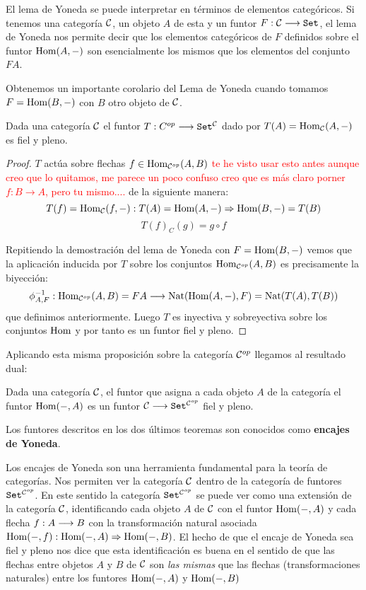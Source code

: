 El lema de Yoneda se puede interpretar en términos de elementos
categóricos. Si tenemos una categoría $\mathcal{C}$, un objeto $A$ de esta
y un funtor $F : \mathcal{C}\longrightarrow \texttt{Set}$, el lema de Yoneda nos permite
decir que los elementos categóricos de $F$ definidos sobre
el funtor $\operatorname{Hom}(A, -)$ son esencialmente los mismos que los
elementos del conjunto $F A$.

Obtenemos un importante corolario del Lema de Yoneda cuando tomamos
$F = \operatorname{Hom}(B, -)$ con $B$ otro objeto de $\mathcal{C}$.

\begin{theorem}
  Dada una categoría $\mathcal{C}$
  el funtor $T : C^{op}\longrightarrow \texttt{Set}^{\mathcal{C}}$ dado por
  $T(A) = \operatorname{Hom}_{\mathcal{C}}(A, -)$ es fiel y pleno.
\end{theorem}
\begin{proof}
  $T$ actúa sobre flechas
  $f \in \operatorname{Hom}_{\mathcal{C}^{op}}(A, B)$ \textcolor{red}{te he visto usar esto antes aunque creo que lo quitamos, me parece un poco confuso creo que es más claro porner $f:B\rightarrow A$, pero tu mismo....}
  de la siguiente manera:
  $$T(f) = \operatorname{Hom}_{\mathcal{C}}(f, -) : T(A) = \operatorname{Hom}(A, -)\Rightarrow \operatorname{Hom}(B, -) = T(B)$$
  $$T(f)_C(g) = g \circ f$$

  Repitiendo la demostración del lema de Yoneda con
  $F = \operatorname{Hom}(B, -)$ vemos que la aplicación inducida por
  $T$ sobre los conjuntos $\operatorname{Hom}_{\mathcal{C}^{op}}(A, B)$ es precisamente la
  biyección:
  $$\phi_{A, F}^{-1} : 
    \operatorname{Hom}_{\mathcal{C}^{op}}(A, B) = FA
  \longrightarrow 
    \operatorname{Nat}(\operatorname{Hom}(A, -), F) = \operatorname{Nat}(T(A), T(B))
 $$
  que definimos anteriormente.
  Luego $T$ es inyectiva y sobreyectiva sobre los conjuntos
  $\operatorname{Hom}$ y
  por tanto es un funtor fiel y pleno.
\end{proof}

Aplicando esta misma proposición sobre la categoría $\mathcal{C}^{op}$ llegamos
al resultado dual:

\begin{theorem}
  Dada una categoría $\mathcal{C}$, el funtor que asigna a cada objeto
  $A$ de la categoría el funtor $\operatorname{Hom}(-, A)$ es un funtor
  $\mathcal{C}\longrightarrow \texttt{Set}^{\mathcal{C}^{op}}$ fiel y pleno.
\end{theorem}

Los funtores descritos en los dos últimos teoremas son conocidos
como \textbf{encajes de Yoneda}.

Los encajes de Yoneda son una herramienta fundamental para la teoría
de categorías. Nos permiten ver la categoría $\mathcal{C}$ dentro de la
categoría de funtores $\texttt{Set}^{\mathcal{C}^{op}}$. En este sentido
la categoría $\texttt{Set}^{\mathcal{C}^{op}}$ se puede ver como una extensión
de la categoría $\mathcal{C}$, identificando cada objeto $A$ de $\mathcal{C}$
con el funtor $\operatorname{Hom}(-, A)$ y cada flecha $f : A\longrightarrow B$ con la
transformación natural asociada
$\operatorname{Hom}(-, f) : \operatorname{Hom}(-, A)\Rightarrow \operatorname{Hom}(-, B)$. El hecho
de que el encaje de
Yoneda sea fiel y pleno nos dice que esta identificación es buena
en el sentido de que las flechas entre objetos $A$ y $B$ de $\mathcal{C}$
son \textit{las mismas} que las flechas (transformaciones naturales)
entre los funtores
$\operatorname{Hom}(-, A)$ y $\operatorname{Hom}(-, B)$

